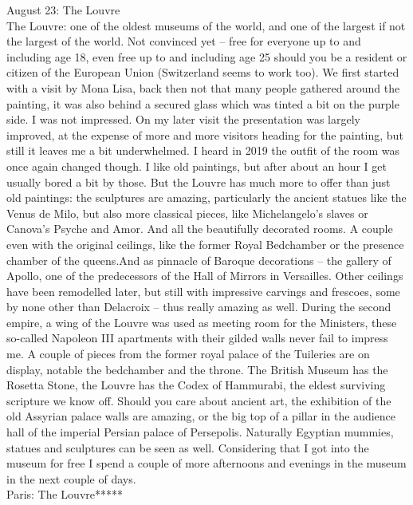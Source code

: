 August 23: The Louvre\\
The Louvre: one of the oldest museums of the world, and one of the largest if not the largest of the world. Not convinced yet -- free for everyone up to and including age 18, even free up to and including age 25 should you be a resident or citizen of the European Union (Switzerland seems to work too). We first started with a visit by Mona Lisa, back then not that many people gathered around the painting, it was also behind a secured glass which was tinted a bit on the purple side. I was not impressed. On my later visit the presentation was largely improved, at the expense of more and more visitors heading for the painting, but still it leaves me a bit underwhelmed. I heard in 2019 the outfit of the room was once again changed though. I like old paintings, but after about an hour I get usually bored a bit by those. But the Louvre has much more to offer than just old paintings: the sculptures are amazing, particularly the ancient statues like the Venus de Milo, but also more classical pieces, like Michelangelo's slaves or Canova's Psyche and Amor. And all the beautifully decorated rooms. A couple even with the original ceilings, like the former Royal Bedchamber or the presence chamber of the queens.And as pinnacle of Baroque decorations -- the gallery of Apollo, one of the predecessors of the Hall of Mirrors in Versailles. Other ceilings have been remodelled later, but still with impressive carvings and frescoes, some by none other than Delacroix -- thus really amazing as well. During the second empire, a wing of the Louvre was used as meeting room for the Ministers, these so-called Napoleon III apartments with their gilded walls never fail to impress me. A couple of pieces from the former royal palace of the Tuileries are on display, notable the bedchamber and the throne. The British Museum has the Rosetta Stone, the Louvre has the Codex of Hammurabi, the eldest surviving scripture we know off. Should you care about ancient art, the exhibition of the old Assyrian palace walls are amazing, or the big top of a pillar in the audience hall of the imperial Persian palace of Persepolis. Naturally Egyptian mummies, statues and sculptures can be seen as well. Considering that I got into the museum for free I spend a couple of more afternoons and evenings in the museum in the next couple of days.\\

Paris: The Louvre*****\\

